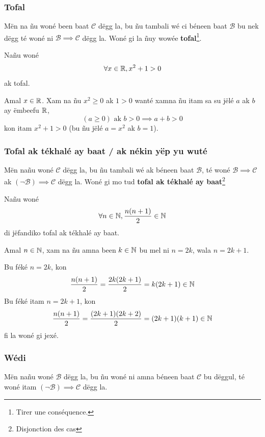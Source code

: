 \documentclass[twoside, a4paper]{article}
\begin{document}
\subsubsection{Tofal}

\begin{tcolorbox}[enhanced jigsaw,breakable,pad at break*=1mm, colback=red!5!white,colframe=white!75!black,title= Téeki,
  watermark color=white]
Mën na ñu woné been baat $\mathcal{C}$ dëgg la, bu ñu tambali wé ci béneen baat $\mathcal{B}$ bu nek dëgg té woné ni $\mathcal{B} \implies \mathcal{C}$ dëgg la. Woné gi la ñuy wowée \textbf{tofal}\footnote{Tirer une conséquence.}.


\end{tcolorbox}




Nañu woné $$ \forall x \in \mathbb{R}, x^2 + 1 > 0$$ ak tofal.

Amal $x\in \mathbb{R}$. Xam na ñu $x^2 \geq 0$ ak $1 > 0$ wanté xamna ñu itam sa su jëlé $a$ ak $b$ ay ëmbeefu $\mathbb{R}$, $$(a \geq 0)\text{ ak }b > 0 \implies a+b >0$$ kon itam $x^2+1>0$ (bu ñu jëlé $a=x^2$ ak $b=1$).


\subsubsection{Tofal ak tékhalé ay baat / ak nékin yëp yu wuté}
\begin{tcolorbox}[enhanced jigsaw,breakable,pad at break*=1mm, colback=red!5!white,colframe=white!75!black,title= Téeki,watermark color=white]
Mën nañu woné $\mathcal{C}$ dëgg la, bu ñu tambali wé ak béneen baat $\mathcal{B}$, té woné  $\mathcal{B} \implies \mathcal{C}$ ak $(\neg\mathcal{B})\implies \mathcal{C}$ dëgg la. Woné gi mo tud \textbf{tofal ak tékhalé ay baat}\footnote{Disjonction des cas}
\end{tcolorbox}
Nañu woné $$ \forall n \in \mathbb{N}, \frac{n(n + 1)}{2} \in \mathbb{N}$$ 
di jëfandiko tofal ak tékhalé ay baat.

Amal $n \in \mathbb{N}$, xam na ñu amna been $k \in \mathbb{N}$ bu mel ni $n = 2 k$, wala $n = 2k+1$. 

Bu féké $n = 2 k$, kon $$\frac{n(n + 1)}{2} = \frac{2k(2k+1)}{2} = k(2k+1) \in \mathbb{N}$$
Bu féké itam $n = 2k+1$, kon $$\frac{n(n + 1)}{2} = \frac{(2k+1)(2k+2)}{2} = (2k+1)(k+1) \in \mathbb{N}$$
fi la woné gi jexé.

\subsubsection{Wédi}
\begin{tcolorbox}[enhanced jigsaw,breakable,pad at break*=1mm, colback=red!5!white,colframe=white!75!black,title= Téeki,watermark color=white]
Mën nañu woné $\mathcal{B}$ dëgg la, bu ñu woné ni amna béneen baat $\mathcal{C}$ bu dëggul, té woné itam $(\neg \mathcal{B}) \implies \mathcal{C}$ dëgg la.
\end{tcolorbox}
\end{document}
